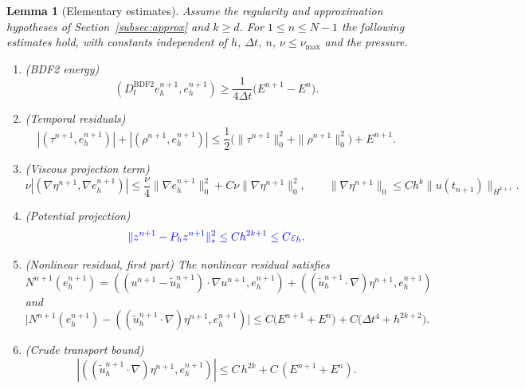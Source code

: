 \documentclass[11pt]{article}
\newtheorem{lemma}{Lemma}
\theoremstyle{remark}\newtheorem{remark}{Remark}
\newcommand{\Dt}{D_t^{\mathrm{BDF2}}}
\newcommand{\tu}{\tilde u_h}
\newcommand{\Ph}{P_h}
\theoremstyle{plain}
\newcommand{\new}[1]{{\color{blue}#1}}
\begin{document}
\begin{lemma}[Elementary estimates]\label{lem:elementary}
Assume the regularity and approximation hypotheses of Section~\ref{subsec:approx} and $k\ge d$. For $1\le n\le N-1$ the following estimates hold, with constants independent of $h$, $\Delta t$, $n$, $\nu\le\nu_{\max}$ and the pressure.
\begin{enumerate}[label=(\roman*),itemsep=2pt]
\item (BDF2 energy)
\begin{equation}\label{eq:bdf2-error-energy}
(\Dt e_h^{n+1},e_h^{n+1})\ge\frac1{4\Delta t}\big(E^{n+1}-E^n\big).
\end{equation}
\item (Temporal residuals)
\begin{equation}\label{eq:temporal-residual-bound}
|(\tau^{n+1},e_h^{n+1})|+|(\rho^{n+1},e_h^{n+1})|
\le\frac12\big(\|\tau^{n+1}\|_0^2+\|\rho^{n+1}\|_0^2\big)+E^{n+1}.
\end{equation}
\item (Viscous projection term)
\begin{equation}\label{eq:viscous-projection-bound}
\nu|(\nabla\eta^{n+1},\nabla e_h^{n+1})|\le\frac\nu4\|\nabla e_h^{n+1}\|_0^2+C\nu\|\nabla\eta^{n+1}\|_0^2,
\qquad
\|\nabla\eta^{n+1}\|_0\le Ch^k\|u(t_{n+1})\|_{H^{k+1}}.
\end{equation}
\item (Potential projection)
\begin{equation}\label{eq:potential-projection-bound}
\new{\|z^{n+1}-\Ph z^{n+1}\|_*^2\le Ch^{2k+1}\le C\varepsilon_h.}
\end{equation}
\item (Nonlinear residual, first part) The nonlinear residual satisfies 
$$
N^{n+1}(e_h^{n+1})=((u^{n+1}-\tu^{n+1})\cdot\nabla u^{n+1},e_h^{n+1})+((\tu^{n+1}\cdot\nabla)\eta^{n+1},e_h^{n+1})
$$ 
and
\begin{equation}\label{eq:nonlinear-residual-preliminary-bound}
\big|N^{n+1}(e_h^{n+1})-((\tu^{n+1}\cdot\nabla)\eta^{n+1},e_h^{n+1})\big|
\le C\big(E^{n+1}+E^n\big)+C\big(\Delta t^4+h^{2k+2}\big).
\end{equation}
\item (Crude transport bound)
\begin{equation}\label{eq:prelim-transport-bound}
|((\tu^{n+1}\cdot\nabla)\eta^{n+1},e_h^{n+1})|
\le C\,h^{2k}+C\,(E^{n+1}+E^n).
\end{equation}
\end{enumerate}
\end{lemma}
\end{document}
